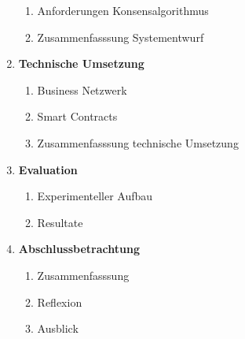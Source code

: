 \begin{small}
\begin{enumerate}
\begin{enumerate}[label*=\arabic*.]
      \item Anforderungen Konsensalgorithmus
      \item Zusammenfasssung Systementwurf
    \end{enumerate}
    \item \textbf{Technische Umsetzung}
    \begin{enumerate}[label*=\arabic*.]
      \item Business Netzwerk
      \item Smart Contracts
      \item Zusammenfasssung technische Umsetzung
    \end{enumerate}
    \item \textbf{Evaluation}
    \begin{enumerate}[label*=\arabic*.]
      \item Experimenteller Aufbau
      \item Resultate
    \end{enumerate}
    \item \textbf{Abschlussbetrachtung}
    \begin{enumerate}[label*=\arabic*.]
      \item Zusammenfasssung
      \item Reflexion
      \item Ausblick
    \end{enumerate}
  \end{enumerate}
\end{small}

\newpage
